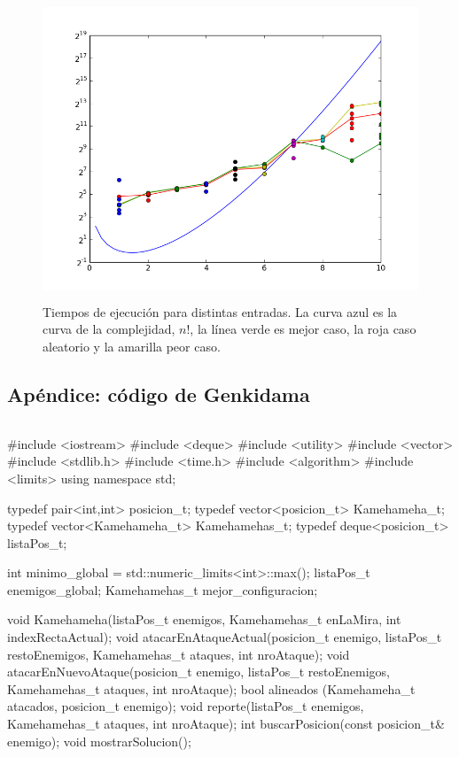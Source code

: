 \documentclass[10pt,a4paper]{article}
\begin{document}
\begin{figure}[h!]
  \centering
  \includegraphics[width=12cm, height=9cm]{HameTime}
  \caption{Tiempos de ejecución para distintas entradas. La curva azul es la curva de la complejidad, $n!$, la línea verde es mejor caso, la roja caso aleatorio y la amarilla peor caso.}
\end{figure}

\newpage
\subsection{Apéndice: código de Genkidama}
\begin{lstlisting}
\end{lstlisting}
#include <iostream>
#include <deque>
#include <utility>
#include <vector>
#include <stdlib.h>
#include <time.h>
#include <algorithm>
#include <limits>
using namespace std;

typedef pair<int,int> posicion_t;
typedef vector<posicion_t> Kamehameha_t;
typedef vector<Kamehameha_t> Kamehamehas_t;
typedef deque<posicion_t> listaPos_t;

int minimo_global = std::numeric_limits<int>::max();
listaPos_t enemigos_global;
Kamehamehas_t mejor_configuracion;

void Kamehameha(listaPos_t enemigos,
                Kamehamehas_t enLaMira,
                int indexRectaActual);
void atacarEnAtaqueActual(posicion_t enemigo,
                          listaPos_t restoEnemigos,
                          Kamehamehas_t ataques,
                          int nroAtaque);
void atacarEnNuevoAtaque(posicion_t enemigo,
                         listaPos_t restoEnemigos,
                         Kamehamehas_t ataques,
                         int nroAtaque);
bool alineados (Kamehameha_t atacados, posicion_t enemigo);
void reporte(listaPos_t enemigos, Kamehamehas_t ataques, int nroAtaque);
int buscarPosicion(const posicion_t& enemigo);
void mostrarSolucion();
\end{document}
